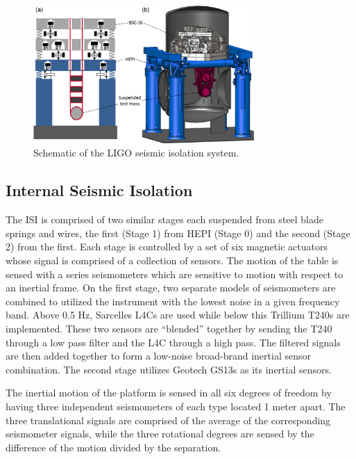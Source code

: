 \documentclass [12pt, proquest]{uwthesis}[2019]
\begin{document}
\begin{figure}[!h]
\begin{center}
\includegraphics[width=0.75\textwidth]{seismicIso.jpg}
\caption[Schematic of the LIGO seismic isolation system]{Schematic of the LIGO seismic isolation system. \cite{ligoSeis}}
\label{wind}
\end{center}
\end{figure}

\subsection{Internal Seismic Isolation}\label{ISI}

The ISI is comprised of two similar stages each suspended from steel blade springs and wires, the first (Stage 1) from HEPI (Stage 0) and the second (Stage 2) from the first. Each stage is controlled by a set of six magnetic actuators whose signal is comprised of a collection of sensors. The motion of the table is sensed with a series seismometers which are sensitive to motion with respect to an inertial frame. On the first stage, two separate models of seismometers are combined to utilized the instrument with the lowest noise in a given frequency band. Above 0.5 Hz, Sarcelles L4Cs are used while below this Trillium T240s are implemented. These two sensors are ``blended'' together by sending the T240 through a low pass filter and the L4C through a high pass. The filtered signals are then added together to form a low-noise broad-brand inertial sensor combination. The second stage utilizes Geotech GS13s as its inertial sensors.

The inertial motion of the platform is sensed in all six degrees of freedom by having three independent seismometers of each type located 1 meter apart. The three translational signals are comprised of the average of the corresponding seismometer signals, while the three rotational degrees are sensed by the difference of the motion divided by the separation.
\end{document}
